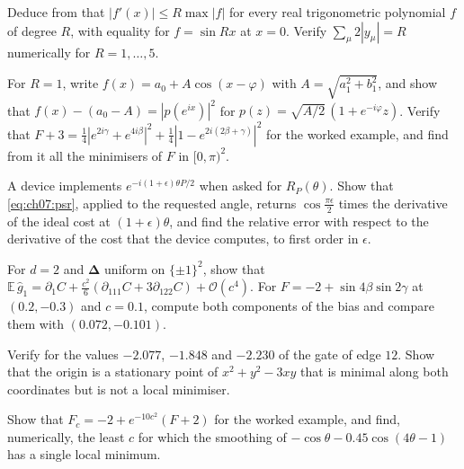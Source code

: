 \documentclass[handoutsbeamer.tex]{subfiles}
\begin{document}
\begin{frame}
\onp{\footnotesize}
\begin{exe}\label{exe:ch07:bernstein}
Deduce from  that $|f'(x)|\le R\max|f|$ for every real trigonometric polynomial $f$ of degree $R$, with equality for $f = \sin Rx$ at $x = 0$. Verify $\sum_\mu2|y_\mu| = R$ numerically for $R = 1,\dots,5$.
\end{exe}
\begin{exe}\label{exe:ch07:sos}
For $R = 1$, write $f(x) = a_0 + A\cos(x-\varphi)$ with $A = \sqrt{a_1^2+b_1^2}$, and show that $f(x)-(a_0-A) = |p(e^{ix})|^2$ for $p(z) = \sqrt{A/2}\,(1+e^{-i\varphi}z)$. Verify that $F+3 = \frac14|e^{2i\gamma}+e^{4i\beta}|^2+\frac14|1-e^{2i(2\beta+\gamma)}|^2$ for the worked example, and find from it all the minimisers of $F$ in $[0,\pi)^2$.
\end{exe}
\end{frame}

\begin{frame}
\onp{\footnotesize}
\begin{exe}\label{exe:ch07:over}
A device implements $e^{-i(1+\epsilon)\theta P/2}$ when asked for $R_P(\theta)$. Show that \eqref{eq:ch07:psr}, applied to the requested angle, returns $\cos\frac{\pi\epsilon}2$ times the derivative of the ideal cost at $(1+\epsilon)\theta$, and find the relative error with respect to the derivative of the cost that the device computes, to first order in $\epsilon$.
\end{exe}
\begin{exe}\label{exe:ch07:spsabias}
For $d = 2$ and $\boldsymbol\Delta$ uniform on $\{\pm1\}^2$, show that $\mathbb E\,\hat g_1 = \partial_1C + \frac{c^2}6(\partial_{111}C + 3\partial_{122}C) + \mathcal O(c^4)$. For $F = -2+\sin4\beta\sin2\gamma$ at $(0.2,-0.3)$ and $c = 0.1$, compute both components of the bias and compare them with $(0.072,-0.101)$.
\end{exe}
\end{frame}

\begin{frame}
\onp{\footnotesize}
\begin{exe}\label{exe:ch07:roto}
Verify  for the values $-2.077$, $-1.848$ and $-2.230$ of the gate of edge $12$. Show that the origin is a stationary point of $x^2+y^2-3xy$ that is minimal along both coordinates but is not a local minimiser.
\end{exe}
\begin{exe}[Smoothing]\label{exe:ch07:smooth}
Show that $F_c = -2+e^{-10c^2}(F+2)$ for the worked example, and find, numerically, the least $c$ for which the smoothing of $-\cos\theta-0.45\cos(4\theta-1)$ has a single local minimum.
\end{exe}
\end{frame}

\begin{frame}[allowframebreaks]
\biblio
\end{frame}
\end{document}
